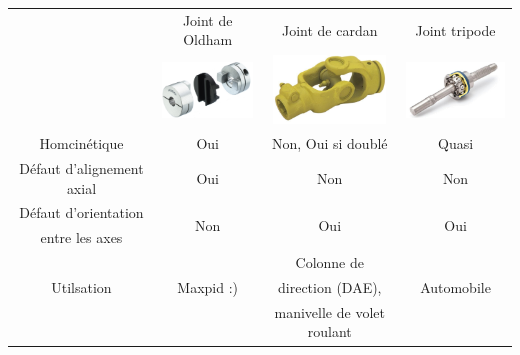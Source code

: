\begin{tabular}{cccc}
\cline{2-4}
& Joint de Oldham & Joint de cardan & Joint tripode \\ \cline{2-4}
\cline{2-4}
&\includegraphics[width=3cm]{images/fig_08.png}&\includegraphics[width=3cm]{images/fig_09.png}& 
\includegraphics[width=3cm]{images/fig_10.png}\\ \hline
Homcinétique & Oui & Non, Oui si doublé & Quasi \\ \hline
Défaut d'alignement axial & Oui & Non & Non \\ \hline
Défaut d'orientation & \multirow{2}{*}{Non} &  \multirow{2}{*}{Oui}& \multirow{2}{*}{Oui} \\ 
entre les axes  & & & \\ \hline 
 & & Colonne de & \\
Utilsation&Maxpid :) &  direction (DAE),  & Automobile \\
&&  manivelle de volet roulant & \\
\hline

\end{tabular}


